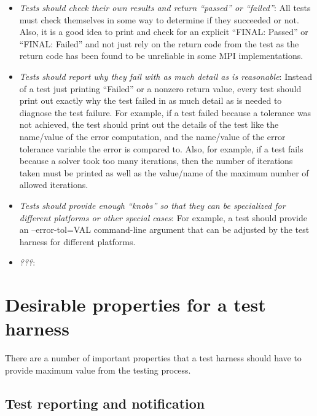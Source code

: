 \documentclass[pdf,ps2pdf,11pt]{SANDreport}
\begin{document}
\begin{itemize}

{}\item\textit{Tests should check their own results and return
``passed'' or ``failed''}: All tests must check themselves in some way
to determine if they succeeded or not.  Also, it is a good idea to
print and check for an explicit ``FINAL: Passed'' or ``FINAL: Failed''
and not just rely on the return code from the test as the return code
has been found to be unreliable in some MPI implementations.

{}\item\textit{Tests should report why they fail with as much detail
as is reasonable}: Instead of a test just printing ``Failed'' or a
nonzero return value, every test should print out exactly why the test
failed in as much detail as is needed to diagnose the test failure.
For example, if a test failed because a tolerance was not achieved,
the test should print out the details of the test like the name/value
of the error computation, and the name/value of the error tolerance
variable the error is compared to.  Also, for example, if a test fails
because a solver took too many iterations, then the number of
iterations taken must be printed as well as the value/name of the
maximum number of allowed iterations.

{}\item\textit{Tests should provide enough ``knobs'' so that they can
be specialized for different platforms or other special cases}: For
example, a test should provide an --error-tol=VAL command-line
argument that can be adjusted by the test harness for different
platforms.

{}\item\textit{???}:

\end{itemize}


%
{}\section{Desirable properties for a test harness}
%

There are a number of important properties that a test harness should
have to provide maximum value from the testing process.

%
\subsection{Test reporting and notification}
%
\end{document}

